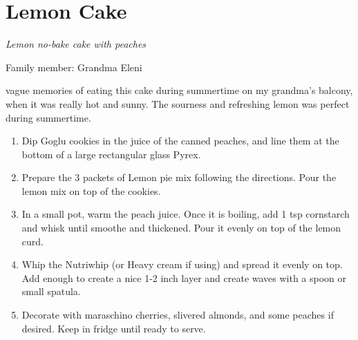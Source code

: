 \chapter{Lemon Cake}
\label{ch:Lemoncake}



%
\textit{Lemon no-bake cake with peaches}

Family member: Grandma Eleni

 vague memories of eating this cake during summertime on my grandma's balcony, when it was really hot and sunny. The sourness and refreshing lemon was perfect during summertime.

\begin{enumerate}
    \item Dip Goglu cookies in the juice of the canned peaches, and line them at the bottom of a large rectangular glass Pyrex.
    \item Prepare the 3 packets of Lemon pie mix following the directions. Pour the lemon mix on top of the cookies.
    \item In a small pot, warm the peach juice. Once it is boiling, add 1 tsp cornstarch and whisk until smoothe and thickened. Pour it evenly on top of the lemon curd.
    \item Whip the Nutriwhip (or Heavy cream if using) and spread it evenly on top. Add enough to create a nice 1-2 inch layer and create waves with a spoon or small spatula. 
    \item Decorate with maraschino cherries, slivered almonds, and some peaches if desired. Keep in fridge until ready to serve.
\end{enumerate}

